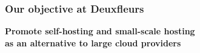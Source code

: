 \documentclass[aspectratio=169]{beamer}
\begin{document}
\begin{frame}
	\frametitle{Our objective at Deuxfleurs}
	
	\begin{center}
		\textbf{Promote self-hosting and small-scale hosting\\
			as an alternative to large cloud providers}
	\end{center}
	\vspace{2em}
\end{frame}
\end{document}

